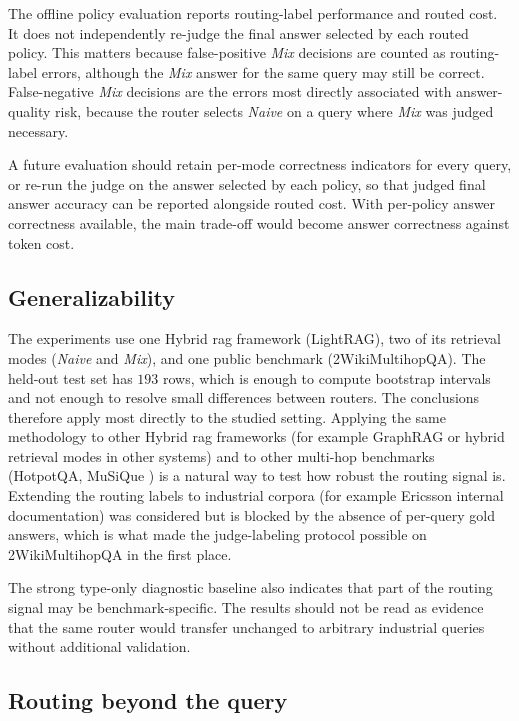 \documentclass[english, bibtex]{kththesis}               %
\numberwithin{listing}{chapter}
\begin{document}
The offline policy evaluation reports routing-label performance and routed cost. It does not independently re-judge the final answer selected by each routed policy. This matters because false-positive \emph{Mix} decisions are counted as routing-label errors, although the \emph{Mix} answer for the same query may still be correct. False-negative \emph{Mix} decisions are the errors most directly associated with answer-quality risk, because the router selects \emph{Naive} on a query where \emph{Mix} was judged necessary.

A future evaluation should retain per-mode correctness indicators for every query, or re-run the judge on the answer selected by each policy, so that judged final answer accuracy can be reported alongside routed cost. With per-policy answer correctness available, the main trade-off would become answer correctness against token cost.

\subsection{Generalizability}
\label{sec:limitGeneralizability}

The experiments use one Hybrid \gls{rag} framework (LightRAG), two of its retrieval modes (\emph{Naive} and \emph{Mix}), and one public benchmark (2WikiMultihopQA). The held-out test set has $193$ rows, which is enough to compute bootstrap intervals and not enough to resolve small differences between routers. The conclusions therefore apply most directly to the studied setting. Applying the same methodology to other Hybrid \gls{rag} frameworks (for example GraphRAG \cite{edge2024graphrag} or hybrid retrieval modes in other systems) and to other multi-hop benchmarks (HotpotQA, MuSiQue \cite{yang2018hotpotqa,trivedi2022musique}) is a natural way to test how robust the routing signal is. Extending the routing labels to industrial corpora (for example Ericsson internal documentation) was considered but is blocked by the absence of per-query gold answers, which is what made the judge-labeling protocol possible on 2WikiMultihopQA in the first place.

The strong type-only diagnostic baseline also indicates that part of the routing signal may be benchmark-specific. The results should not be read as evidence that the same router would transfer unchanged to arbitrary industrial queries without additional validation.

\subsection{Routing beyond the query}
\label{sec:limitRouting}
\end{document}
